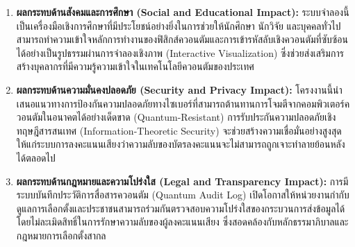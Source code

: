 \begin{enumerate}
    \item \textbf{ผลกระทบด้านสังคมและการศึกษา (Social and Educational Impact):} ระบบจำลองนี้เป็นเครื่องมือเชิงการศึกษาที่มีประโยชน์อย่างยิ่งในการช่วยให้นักศึกษา นักวิจัย และบุคคลทั่วไปสามารถทำความเข้าใจหลักการทำงานของฟิสิกส์ควอนตัมและการเข้ารหัสลับเชิงควอนตัมที่ซับซ้อนได้อย่างเป็นรูปธรรมผ่านการจำลองเชิงภาพ (Interactive Visualization) ซึ่งช่วยส่งเสริมการสร้างบุคลากรที่มีความรู้ความเข้าใจในเทคโนโลยีควอนตัมของประเทศ
    \item \textbf{ผลกระทบด้านความมั่นคงปลอดภัย (Security and Privacy Impact):} โครงงานนี้นำเสนอแนวทางการป้องกันความปลอดภัยทางไซเบอร์ที่สามารถต้านทานการโจมตีจากคอมพิวเตอร์ควอนตัมในอนาคตได้อย่างเด็ดขาด (Quantum-Resistant) การรับประกันความปลอดภัยเชิงทฤษฎีสารสนเทศ (Information-Theoretic Security) จะช่วยสร้างความเชื่อมั่นอย่างสูงสุดให้แก่ระบบการลงคะแนนเสียงว่าความลับของบัตรลงคะแนนจะไม่สามารถถูกเจาะทำลายย้อนหลังได้ตลอดไป
    \item \textbf{ผลกระทบด้านกฎหมายและความโปร่งใส (Legal and Transparency Impact):} การมีระบบบันทึกประวัติการสื่อสารควอนตัม (Quantum Audit Log) เปิดโอกาสให้หน่วยงานกำกับดูแลการเลือกตั้งและประชาชนสามารถร่วมกันตรวจสอบความโปร่งใสของกระบวนการส่งข้อมูลได้ โดยไม่ละเมิดสิทธิ์ในการรักษาความลับของผู้ลงคะแนนเสียง ซึ่งสอดคล้องกับหลักธรรมาภิบาลและกฎหมายการเลือกตั้งสากล
\end{enumerate}
